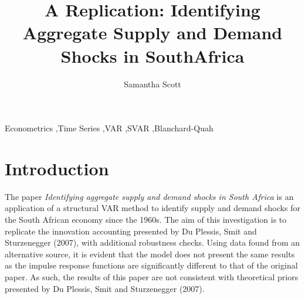 \documentclass[11pt,preprint, authoryear]{elsarticle}
\numberwithin{equation}{section}
\numberwithin{figure}{section}
\numberwithin{table}{section}
\begin{document}
\begin{frontmatter}  %

\title{A Replication: Identifying Aggregate Supply and Demand Shocks in
SouthAfrica}





\author[Add1]{Samantha Scott}





\address[Add1]{Stellenbosch University, Cape Town, South Africa}



\vspace{1cm}


\begin{keyword}
\footnotesize{
Econometrics \sep Time Series \sep VAR \sep SVAR \sep Blanchard-Quah \\
\vspace{0.3cm}
}
\end{keyword}



\vspace{0.5cm}

\end{frontmatter}


\renewcommand{\contentsname}{Table of Contents}
{\tableofcontents}

\pagestyle{fancy}
\chead{}
\lfoot{}
\lhead{}
\cfoot{}


\headsep 35pt %




\newpage

\newpage

\hypertarget{introduction}{%
\section{Introduction}\label{introduction}}

The paper \emph{Identifying aggregate supply and demand shocks in South
Africa} is an application of a structural VAR method to identify supply
and demand shocks for the South African economy since the 1960s. The aim
of this investigation is to replicate the innovation accounting
presented by Du Plessis, Smit and Sturzenegger (2007), with additional
robustness checks. Using data found from an alternative source, it is
evident that the model does not present the same results as the impulse
response functions are significantly different to that of the original
paper. As such, the results of this paper are not consistent with
theoretical priors presented by Du Plessis, Smit and Sturzenegger
(2007).
\end{document}
